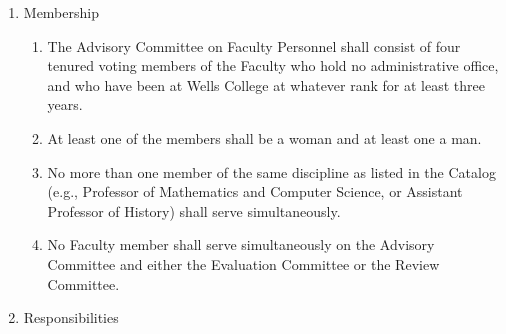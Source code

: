 \documentclass{manual}
\newcommand{\itemLevelA}{\alph*.}
\newcommand{\itemLevelB}{\arabic*)}
\newcommand{\itemRefA}{\alph*}
\newcommand{\itemRefB}{\arabic*}
\begin{document}
	\begin{enumerate}[label=\itemLevelA,ref=\itemRefA]
	\item Membership \label{item:membership06}

		\begin{enumerate}[label=\itemLevelB,ref=\itemRefB]
		\item The Advisory Committee on Faculty Personnel shall consist of four tenured voting members of the Faculty who hold no administrative office, and who have been at Wells College at whatever rank for at least three years.
		\item At least one of the members shall be a woman and at least one a man.
		\item\label{iitem:crossdiscipline07} No more than one member of the same discipline as listed in the Catalog (e.g., Professor of Mathematics and Computer Science, or Assistant Professor of History) shall serve simultaneously.
		\item No Faculty member shall serve simultaneously on the Advisory Committee and either the Evaluation Committee or the Review Committee.
		\end{enumerate}

	\item Responsibilities


\end{enumerate}
\end{document}
